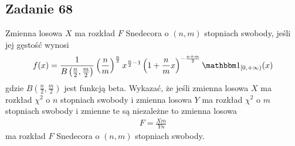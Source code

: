 \subsection*{Zadanie 68}
Zmienna losowa $ X $ ma rozkład $ F $ Snedecora o $ (n,m) $ stopniach swobody, jeśli jej gęstość wynosi
\begin{gather*}
f(x)=\frac{1}{B \left(\frac{n}{2},\frac{m}{2}\right)}\left(\frac{n}{m}\right)^\frac{n}{2}x^{\frac{n}{2}-1}\left(1+\frac{n}{m}x\right)^{-\frac{n+m}{2}}\mathbbm1_{[0,+\infty )}(x)
\end{gather*}
gdzie $ B\left(\frac{n}{2},\frac{m}{2}\right) $ jest funkcją beta. Wykazać, że jeśli zmienna losowa $ X $ ma rozkład $ \chi^2 $ o $ n $ stopniach swobody i zmienna losowa $ Y $ ma rozkład $ \chi^2 $ o $ m $ stopniach swobody i zmienne te są niezależne to zmienna losowa
\begin{gather*}
F=\frac{Xm}{Yn}
\end{gather*}
ma rozkład $ F $ Snedecora o $ (n,m) $ stopniach swobody.

